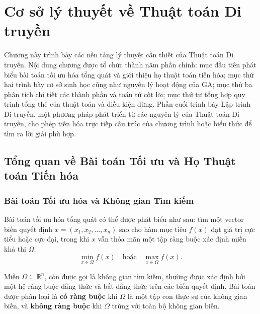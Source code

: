 \chapter{Cơ sở lý thuyết về Thuật toán Di truyền}
\label{chap:co-so-ly-thuyet}

Chương này trình bày các nền tảng lý thuyết cần thiết của Thuật toán Di
truyền. Nội dung chương được tổ chức thành năm
phần chính: mục đầu tiên phát biểu bài toán tối ưu hóa tổng quát và giới
thiệu họ thuật toán tiến hóa; mục thứ hai trình bày cơ sở sinh học cũng
như nguyên lý hoạt động của GA; mục thứ ba phân tích chi tiết các thành
phần và toán tử cốt lõi; mục thứ tư tổng hợp quy trình tổng thể của
thuật toán và điều kiện dừng. Phần cuối trình bày Lập trình Di truyền,
một phương pháp phát triển từ các nguyên
lý của Thuật toán Di truyền, cho phép tiến hóa trực tiếp cấu trúc
của chương trình hoặc biểu thức để tìm ra lời giải phù hợp.

\section{Tổng quan về Bài toán Tối ưu và Họ Thuật toán Tiến hóa}
\label{sec:tong-quan}

\subsection*{Bài toán Tối ưu hóa và Không gian Tìm kiếm}
\label{subsec:bai-toan-toi-uu}

Bài toán tối ưu hóa tổng quát có thể được phát biểu như sau: tìm một
vector biến quyết định $x = (x_1, x_2, \ldots, x_n)$ sao cho hàm mục
tiêu $f(x)$ đạt giá trị cực tiểu hoặc cực đại, trong khi $x$ vẫn thỏa
mãn một tập ràng buộc xác định miền khả thi $\Omega$:
\begin{equation}
\min_{x \in \Omega} f(x) \quad \text{hoặc} \quad \max_{x \in \Omega} f(x).
\label{eq:bai-toan-toi-uu}
\end{equation}

Miền $\Omega \subseteq \mathbb{R}^n$, còn được gọi là không gian tìm
kiếm, thường được xác định bởi một hệ ràng buộc đẳng thức và bất đẳng
thức trên các biến quyết định. Bài toán được phân loại là \textbf{có
ràng buộc} khi $\Omega$ là một tập con thực sự của không gian biến, và
\textbf{không ràng buộc} khi $\Omega$ trùng với toàn bộ không gian biến.


